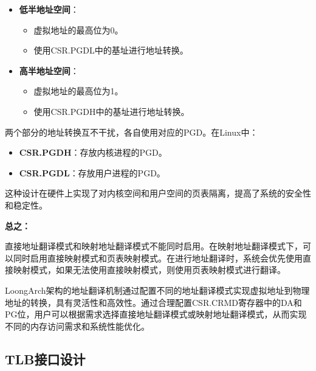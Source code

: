 \begin{enumerate}
\begin{itemize}
\begin{itemize}
      \begin{itemize}
      \tightlist
      \item
        \textbf{低半地址空间}：

        \begin{itemize}
        \tightlist
        \item
          虚拟地址的最高位为0。
        \item
          使用CSR.PGDL中的基址进行地址转换。
        \end{itemize}
      \item
        \textbf{高半地址空间}：

        \begin{itemize}
        \tightlist
        \item
          虚拟地址的最高位为1。
        \item
          使用CSR.PGDH中的基址进行地址转换。
        \end{itemize}
      \end{itemize}

      两个部分的地址转换互不干扰，各自使用对应的PGD。在Linux中：

      \begin{itemize}
      \tightlist
      \item
        \textbf{CSR.PGDH}：存放内核进程的PGD。
      \item
        \textbf{CSR.PGDL}：存放用户进程的PGD。
      \end{itemize}

      这种设计在硬件上实现了对内核空间和用户空间的页表隔离，提高了系统的安全性和稳定性。
    \end{itemize}
  \end{itemize}
\end{enumerate}

\textbf{总之：}

直接地址翻译模式和映射地址翻译模式不能同时启用。在映射地址翻译模式下，可以同时启用直接映射模式和页表映射模式。在进行地址翻译时，系统会优先使用直接映射模式，如果无法使用直接映射模式，则使用页表映射模式进行翻译。

LoongArch架构的地址翻译机制通过配置不同的地址翻译模式实现虚拟地址到物理地址的转换，具有灵活性和高效性。通过合理配置CSR.CRMD寄存器中的DA和PG位，用户可以根据需求选择直接地址翻译模式或映射地址翻译模式，从而实现不同的内存访问需求和系统性能优化。

\subsection{TLB接口设计}\label{sec:10-mmu-016}

